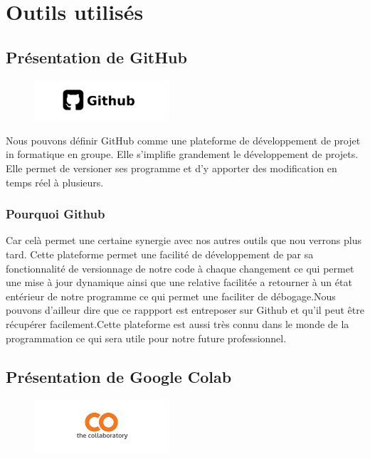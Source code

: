 \section{Outils utilisés}

\subsection{Présentation de GitHub}

\begin{figure}[h]
  \begin{center}
  \includegraphics[width=5cm]{./images/github.jpg}
  \end{center}
\end{figure}

Nous pouvons définir GitHub comme une plateforme de développement de projet in formatique en groupe. Elle s'implifie grandement le développement de projets. Elle permet de versioner ses programme et d'y apporter des modification en temps réel à plusieurs.

\subsubsection{Pourquoi Github}
Car celà permet une certaine synergie avec nos autres outils que nou verrons plus tard. Cette plateforme permet une facilité de développement de par sa fonctionnalité de versionnage de notre code à chaque changement ce qui permet une mise à jour dynamique ainsi que une relative facilitée a retourner à un état entérieur de notre programme ce qui permet une faciliter de débogage.Nous pouvons d'ailleur dire que ce rappport est entreposer sur Github et qu'il peut être récupérer facilement.Cette plateforme est aussi très connu dans le monde de la programmation ce qui sera utile pour notre future professionnel.

\subsection{Présentation de Google Colab}

\begin{figure}[h]
\begin{center}
\includegraphics[width=5cm]{./images/Colab_logo.png}
\end{center}
\end{figure}

